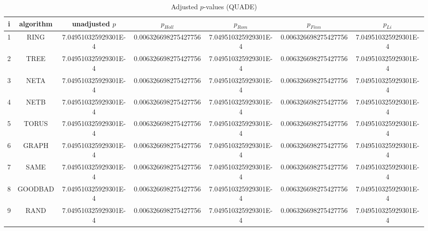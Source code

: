 \documentclass[a4paper,10pt]{article}
\begin{document}
\begin{landscape}
\begin{table}[!htp]
\centering\scriptsize
\caption{Adjusted $p$-values (QUADE)}
\begin{tabular}{ccccccc}
i&algorithm&unadjusted $p$&$p_{Holl}$&$p_{Rom}$&$p_{Finn}$&$p_{Li}$\\
\hline
1& RING&7.049510325929301E-4&0.006326698275427756&7.049510325929301E-4&0.006326698275427756&7.049510325929301E-4\\
2& TREE&7.049510325929301E-4&0.006326698275427756&7.049510325929301E-4&0.006326698275427756&7.049510325929301E-4\\
3& NETA&7.049510325929301E-4&0.006326698275427756&7.049510325929301E-4&0.006326698275427756&7.049510325929301E-4\\
4& NETB&7.049510325929301E-4&0.006326698275427756&7.049510325929301E-4&0.006326698275427756&7.049510325929301E-4\\
5& TORUS&7.049510325929301E-4&0.006326698275427756&7.049510325929301E-4&0.006326698275427756&7.049510325929301E-4\\
6& GRAPH&7.049510325929301E-4&0.006326698275427756&7.049510325929301E-4&0.006326698275427756&7.049510325929301E-4\\
7& SAME&7.049510325929301E-4&0.006326698275427756&7.049510325929301E-4&0.006326698275427756&7.049510325929301E-4\\
8& GOODBAD&7.049510325929301E-4&0.006326698275427756&7.049510325929301E-4&0.006326698275427756&7.049510325929301E-4\\
9& RAND&7.049510325929301E-4&0.006326698275427756&7.049510325929301E-4&0.006326698275427756&7.049510325929301E-4\\
\hline
\end{tabular}
\end{table}

\end{landscape}
\end{document}
